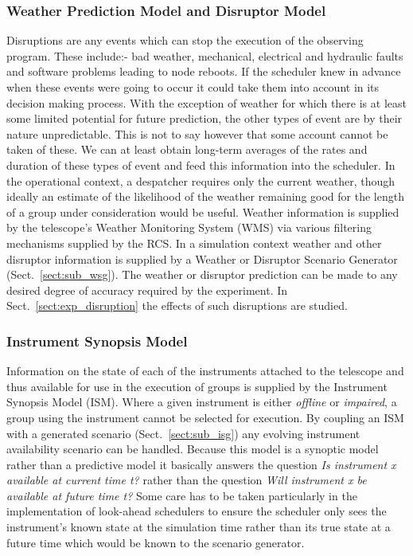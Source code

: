 \subsubsection{Weather Prediction Model and Disruptor Model}
Disruptions are any events which can stop the execution of the observing program. These include:- bad weather, mechanical, electrical and hydraulic faults and software problems leading to node reboots. If the scheduler knew in advance when these events were going to occur it could take them into account in its decision making process. With the exception of weather for which there is at least some limited potential for future prediction, the other types of event are by their nature unpredictable. This is not to say however that some account cannot be taken of these. We can at least obtain long-term averages of the rates and duration of these types of event and feed this information into the scheduler. In the operational context, a despatcher requires only the current weather, though ideally an estimate of the likelihood of the weather remaining good for the length of a group under consideration would be useful. Weather information is supplied by the telescope's Weather Monitoring System (WMS) via various filtering mechanisms supplied by the RCS. In a simulation context weather and other disruptor information is supplied by a Weather or Disruptor Scenario Generator (Sect.~\ref{sect:sub_wsg}). The weather or disruptor prediction can be made to any desired degree of accuracy required by the experiment. In Sect.~\ref{sect:exp_disruption} the effects of such disruptions are studied.


\subsubsection{Instrument Synopsis Model}
Information on the state of each of the instruments attached to the telescope and thus available for use in the execution of groups is supplied by the Instrument Synopsis Model (ISM). Where a given instrument is either \emph{offline} or \emph{impaired}, a group using the instrument cannot be selected for execution. By coupling an ISM with a generated scenario (Sect.~\ref{sect:sub_isg}) any evolving instrument availability scenario can be handled. Because this model is a synoptic model rather than a predictive model it basically answers the question \emph{Is instrument x available at current time t?} rather than the question \emph{Will instrument x be available at future time t?} Some care has to be taken particularly in the implementation of look-ahead schedulers to ensure the scheduler only sees the instrument's known state at the simulation time rather than its true state at a future time which would be known to the scenario generator.

